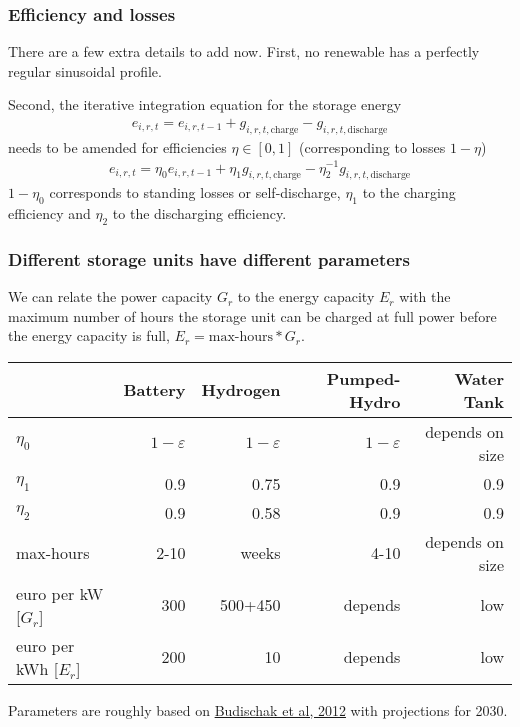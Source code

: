 \documentclass[10pt,aspectratio=169,dvipsnames]{beamer}
\newcommand{\ra}[1]{\renewcommand{\arraystretch}{#1}}
\begin{document}
\begin{frame}
  \frametitle{Efficiency and losses}

  There are a few extra details to add now. First, no renewable has a perfectly regular sinusoidal profile.

  Second, the iterative integration equation for the storage energy
  \begin{align*}
    e_{i,r,t} = e_{i,r,t-1} + g_{i,r,t,\textrm{charge}} -  g_{i,r,t,\textrm{discharge}}
  \end{align*}
  needs to be amended for \alert{efficiencies} $\eta\in [0,1]$ (corresponding to \alert{losses} $1-\eta$)
  \begin{align*}
    e_{i,r,t} = \eta_0e_{i,r,t-1} + \eta_1g_{i,r,t,\textrm{charge}} -  \eta_2^{-1} g_{i,r,t,\textrm{discharge}}
  \end{align*}
  $1-\eta_0$ corresponds to \alert{standing losses} or \alert{self-discharge}, $\eta_1$ to the \alert{charging efficiency} and $\eta_2$ to the \alert{discharging efficiency}.

\end{frame}


\begin{frame}
  \frametitle{Different storage units have different parameters}

  We can relate the power capacity $G_r$ to the energy capacity $E_r$
  with the maximum number of hours the storage unit can be charged at full
power before the energy capacity is full, $E_r =
  \textrm{max-hours}*G_r$.

  \ra{1.05}
  \begin{table}[!t]
    \begin{tabular}{lrrrr}
      \toprule
      & Battery & Hydrogen & Pumped-Hydro & Water Tank\\
      \midrule
      $\eta_0$ & $1-\varepsilon$ & $1-\varepsilon$ & $1-\varepsilon$ & depends on size  \\
      $\eta_1$ & 0.9 & 0.75 & 0.9 & 0.9 \\
      $\eta_2$ & 0.9 & 0.58 & 0.9 & 0.9 \\
      max-hours & 2-10 & weeks & 4-10 & depends on size \\
      euro per kW [$G_r$] &300 &500+450 & depends& low \\
      euro per kWh [$E_r$] &200 & 10 &depends&low \\
      \bottomrule
    \end{tabular}
  \end{table}
Parameters are roughly based on
\href{http://www.sciencedirect.com/science/article/pii/S0378775312014759}{Budischak
  et al, 2012} with projections for 2030.


\end{frame}
\end{document}
